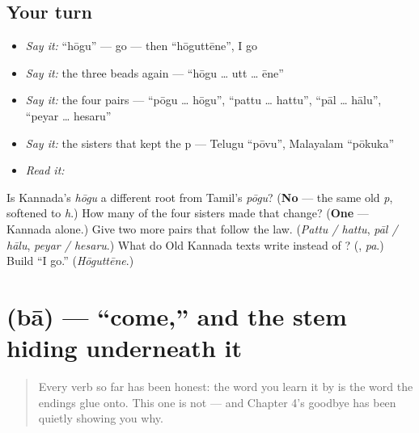 \subsection*{Your turn}
\begin{itemize}
\raggedright
  \item \emph{Say it:} \textquotedblleft{}hōgu\textquotedblright{} — go — then \textquotedblleft{}hōguttēne\textquotedblright{}, I go
  \item \emph{Say it:} the three beads again — \textquotedblleft{}hōgu … utt … ēne\textquotedblright{}
  \item \emph{Say it:} the four pairs — \textquotedblleft{}pōgu … hōgu\textquotedblright{}, \textquotedblleft{}pattu … hattu\textquotedblright{}, \textquotedblleft{}pāl … hālu\textquotedblright{}, \textquotedblleft{}peyar … hesaru\textquotedblright{}
  \item \emph{Say it:} the sisters that kept the p — Telugu \textquotedblleft{}pōvu\textquotedblright{}, Malayalam \textquotedblleft{}pōkuka\textquotedblright{}
  \item \emph{Read it:} \textbf{}
\end{itemize}

\begin{tcolorbox}[breakable,colback=teal!4,colframe=teal!35!black,title={Before you move on}]
Is Kannada's \emph{hōgu} a different root from Tamil's \emph{pōgu}? (\textbf{No} — the same old \emph{p}, softened to \emph{h}.) How many of the four sisters made that change? (\textbf{One} — Kannada alone.) Give two more pairs that follow the law. (\emph{Pattu / hattu}, \emph{pāl / hālu}, \emph{peyar / hesaru}.) What do Old Kannada texts write instead of ? (\textbf{}, \emph{pa}.) Build \textquotedblleft{}I go.\textquotedblright{} (\emph{Hōguttēne}.)
\end{tcolorbox}
\section[\texorpdfstring{\kn{ಬಾ} (bā / baru)}{ಬಾ (bā / baru)}]{ (bā) — \textquotedblleft{}come,\textquotedblright{} and the stem hiding underneath it}

\label{lesson:KA-C32-baa}



\begin{quote}
Every verb so far has been honest: the word you learn it by is the word the endings glue onto. This one is not — and Chapter 4's goodbye has been quietly showing you why.
\end{quote}


